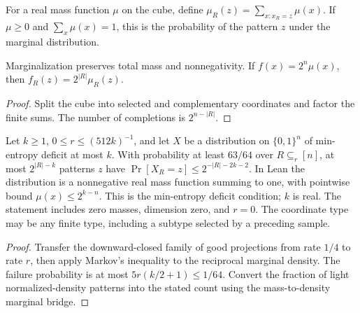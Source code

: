 \begin{definition}
  \label{def:analysis-coordinate-mass}
  \leanok
  For a real mass function $\mu$ on the cube, define
  $\mu_R(z)=\sum_{x:x_R=z}\mu(x)$. If $\mu\ge0$ and $\sum_x\mu(x)=1$,
  this is the probability of the pattern $z$ under the marginal distribution.
\end{definition}

\begin{theorem}
  \label{thm:analysis-coordinate-mass}
  \leanok
  Marginalization preserves total mass and nonnegativity. If
  $f(x)=2^n\mu(x)$, then $f_R(z)=2^{|R|}\mu_R(z)$.
\end{theorem}
\begin{proof}
  \leanok
  Split the cube into selected and complementary coordinates and factor the
  finite sums. The number of completions is $2^{n-|R|}$.
\end{proof}

\begin{lemma}
  \label{lem:analysis-improved-light-patterns}
  \leanok
  Let $k\ge1$, $0\le r\le(512k)^{-1}$, and let $X$ be a distribution on
  $\{0,1\}^n$ of min-entropy deficit at most $k$. With probability at least
  $63/64$ over $R\subseteq_r[n]$, at most $2^{|R|-k}$ patterns $z$ have
  $\Pr[X_R=z]\le2^{-|R|-2k-2}$.
  In Lean the distribution is a nonnegative real mass function summing to
  one, with pointwise bound $\mu(x)\le2^{k-n}$. This is the min-entropy
  deficit condition; $k$ is real. The statement includes zero masses,
  dimension zero, and $r=0$. The coordinate type may be any finite type,
  including a subtype selected by a preceding sample.
\end{lemma}
\begin{proof}
  \leanok
  Transfer the downward-closed family of good projections from rate $1/4$
  to rate $r$, then apply Markov's inequality to the reciprocal marginal
  density. The failure probability is at most $5r(k/2+1)\le1/64$.
  Convert the fraction of light normalized-density patterns into the
  stated count using the mass-to-density marginal bridge.
\end{proof}

